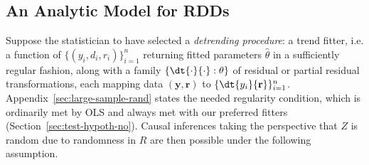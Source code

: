 \subsection{An Analytic Model for RDDs} \label{sec:model-eey-c-r}

Suppose the statistician to have selected a \textit{detrending procedure}: a
trend fitter, i.e. a function of
$\{({y}_{i},d_{i},r_{i})\}_{i=1}^{n}$ returning
fitted parameters $\hat{\theta}$ in a sufficiently regular
fashion, along with a
family $\{\dt{\cdot}{\cdot}: \theta\}$ of residual or partial
residual transformations, each mapping data $(\mathbf{y}, \mathbf{r})$ to
$\{\dt {y_{i}}{\mathbf{r}} \}_{i=1}^{n}$.
Appendix~\ref{sec:large-sample-rand}
states the
needed regularity condition, which is ordinarily met by OLS and always
met with our preferred fitters (Section~\ref{sec:test-hypoth-no}).
Causal inferences taking
the perspective that $Z$ is random due to
randomness in $R$ are then possible under the following assumption.

